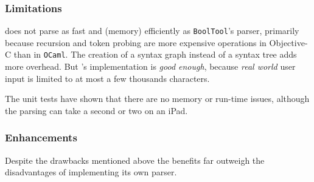\subsubsection{Limitations}

\BoolTool does not parse as fast and (memory) efficiently as \verb+BoolTool+'s parser,
primarily because recursion and token probing are more expensive operations in Objective-C than in \verb+OCaml+.
The creation of a syntax graph instead of a syntax tree adds more overhead.
But \Nyaya's implementation is {\em good enough}, 
because {\em real world} user input is limited to at most a few thousands characters.

The unit tests have shown that there are no memory or run-time issues, 
although the parsing can take a second or two on an iPad.

\subsubsection{Enhancements}

Despite the drawbacks mentioned above
the benefits far outweigh the disadvantages of implementing its own parser.

